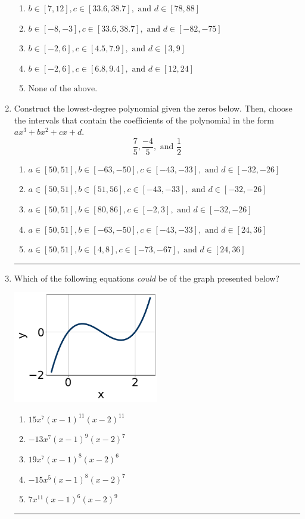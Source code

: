 \documentclass[14pt]{extbook}
\newcommand{\litem}[1]{\item#1\hspace*{-1cm}\rule{\textwidth}{0.4pt}}
\begin{document}
\begin{enumerate}
{\begin{enumerate}[label=\Alph*.]
\item \( b \in [7, 12], c \in [33.6, 38.7], \text{ and } d \in [78, 88] \)
\item \( b \in [-8, -3], c \in [33.6, 38.7], \text{ and } d \in [-82, -75] \)
\item \( b \in [-2, 6], c \in [4.5, 7.9], \text{ and } d \in [3, 9] \)
\item \( b \in [-2, 6], c \in [6.8, 9.4], \text{ and } d \in [12, 24] \)
\item \( \text{None of the above.} \)

\end{enumerate} }
\litem{
Construct the lowest-degree polynomial given the zeros below. Then, choose the intervals that contain the coefficients of the polynomial in the form $ax^3+bx^2+cx+d$.\[ \frac{7}{5}, \frac{-4}{5}, \text{ and } \frac{1}{2} \]\begin{enumerate}[label=\Alph*.]
\item \( a \in [50, 51], b \in [-63, -50], c \in [-43, -33], \text{ and } d \in [-32, -26] \)
\item \( a \in [50, 51], b \in [51, 56], c \in [-43, -33], \text{ and } d \in [-32, -26] \)
\item \( a \in [50, 51], b \in [80, 86], c \in [-2, 3], \text{ and } d \in [-32, -26] \)
\item \( a \in [50, 51], b \in [-63, -50], c \in [-43, -33], \text{ and } d \in [24, 36] \)
\item \( a \in [50, 51], b \in [4, 8], c \in [-73, -67], \text{ and } d \in [24, 36] \)

\end{enumerate} }
\litem{
Which of the following equations \textit{could} be of the graph presented below?
\begin{center}
    \includegraphics[width=0.5\textwidth]{../Figures/polyGraphToFunctionC.png}
\end{center}
\begin{enumerate}[label=\Alph*.]
\item \( 15x^{7} (x - 1)^{11} (x - 2)^{11} \)
\item \( -13x^{7} (x - 1)^{9} (x - 2)^{7} \)
\item \( 19x^{7} (x - 1)^{8} (x - 2)^{6} \)
\item \( -15x^{5} (x - 1)^{8} (x - 2)^{7} \)
\item \( 7x^{11} (x - 1)^{6} (x - 2)^{9} \)

\end{enumerate} }
\end{enumerate}
\end{document}
